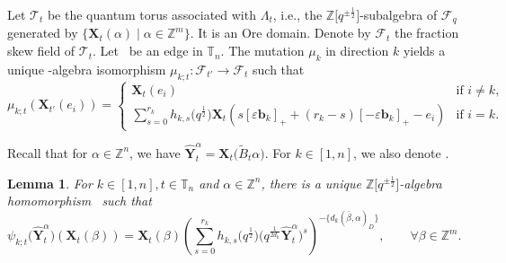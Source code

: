 \documentclass[11pt]{article}
\numberwithin{equation}{section}
\newcommand{\Z}{\mathbb{Z}}
\numberwithin{equation}{section}
\newtheorem{Lemma}[Theorem]{Lemma}
\begin{document}
Let $\mathcal{T}_{t}$ be the quantum torus associated with $\Lambda_{t}$, i.e., the $\Z\big[q^{\pm\frac{1}{2}}\big]$-subalgebra of $\mathcal{F}_q$ generated by $\{\mathbf{X}_t(\alpha)\mid \alpha\in \Z^m\}$. It is an Ore domain. Denote by $\mathcal{F}_t$ the fraction skew field of $\mathcal{T}_t$.
Let~ be an edge in $\mathbb{T}_n$. The mutation $\mu_k$ in direction $k$ yields a unique \smash{$\Z\big[q^{\pm\frac{1}{2}}\big]$}-algebra isomorphism $\mu_{k;t}\colon\mathcal{F}_{t'}\to \mathcal{F}_t$ such that
\[
 \mu_{k;t}(\mathbf{X}_{t'}(e_i))=\begin{cases}
 \mathbf{X}_t(e_i) &\text{if $i\neq k$,}\\
 \displaystyle \sum\limits_{s=0}^{r_k}h_{k,s}\bigl(q^{\frac{1}{2}}\bigr)\mathbf{X}_t(s[\varepsilon \mathbf{b}_k]_{+}+(r_{k}-s)[-\varepsilon \mathbf{b}_k]_+-e_i)&\text{if $i=k$.}
 \end{cases}
\]

Recall that for $\alpha\in \Z^n$, we have $\hat{\mathbf{Y}}_t^\alpha=\mathbf{X}_t\bigl(\tilde{B}_t\alpha\bigr)$. For $k\in [1,n]$, we also denote .
\begin{Lemma}
 For $k\in[1,n],t\in\mathbb{T}_{n}$ and $\alpha\in\mathbb{Z}^{n}$, there is a unique $\Z\big[q^{\pm\frac{1}{2}}\big]$-algebra homomorphism~ such that
 \[
\psi_{k;t}\bigl(\mathbf{\hat{Y}}_{t}^{\alpha}\bigr)(\mathbf{X}_t(\beta))=\mathbf{X}_{t}(\beta)\left(\sum\limits_{s=0}^{r_k} h_{k,s}\bigl(q^{\frac{1}{2}}\bigr)\bigl(q^{\frac{1}{2d_{k}}}\mathbf{\hat{Y}}_{t}^{\alpha}\bigr)^{s}\right)^{-\{d_{k}(\bar{\beta},\alpha)_D\}}, \qquad \forall \beta\in \mathbb{Z}^m.
 \]
 \end{Lemma}
\end{document}
